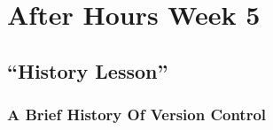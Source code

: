\chapter{After Hours Week 5}
\section{``History Lesson''}
\subsection{A Brief History Of Version Control}
